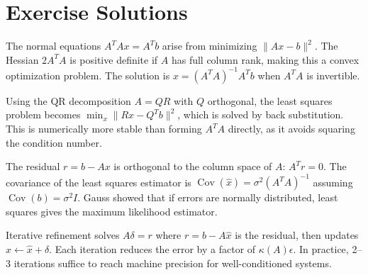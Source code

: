\section{Exercise Solutions}

\begin{solution}
The normal equations $A^TAx = A^Tb$ arise from minimizing $\|Ax - b\|^2$. The Hessian $2A^TA$ is positive definite if $A$ has full column rank, making this a convex optimization problem. The solution is $x = (A^TA)^{-1}A^Tb$ when $A^TA$ is invertible.
\end{solution}

\begin{solution}
Using the QR decomposition $A = QR$ with $Q$ orthogonal, the least squares problem becomes $\min_x \|Rx - Q^Tb\|^2$, which is solved by back substitution. This is numerically more stable than forming $A^TA$ directly, as it avoids squaring the condition number.
\end{solution}

\begin{solution}
The residual $r = b - Ax$ is orthogonal to the column space of $A$: $A^Tr = 0$. The covariance of the least squares estimator is $\operatorname{Cov}(\hat{x}) = \sigma^2(A^TA)^{-1}$ assuming $\operatorname{Cov}(b) = \sigma^2 I$. Gauss showed that if errors are normally distributed, least squares gives the maximum likelihood estimator.
\end{solution}

\begin{solution}
Iterative refinement solves $A\delta = r$ where $r = b - A\hat{x}$ is the residual, then updates $\hat{x} \leftarrow \hat{x} + \delta$. Each iteration reduces the error by a factor of $\kappa(A)\epsilon$. In practice, 2--3 iterations suffice to reach machine precision for well-conditioned systems.
\end{solution}
